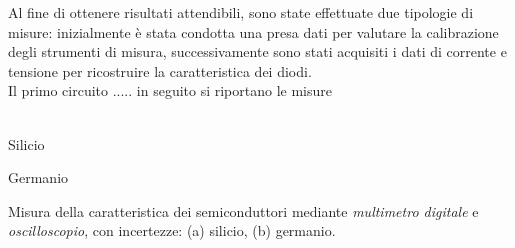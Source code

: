 \documentclass[@MAIN@]{subfiles}
\begin{document}
    Al fine di ottenere risultati attendibili, sono state effettuate due tipologie
    di misure: inizialmente è stata condotta una presa dati per valutare la
    calibrazione degli strumenti di misura, successivamente sono stati acquisiti
    i dati di corrente e tensione per ricostruire la caratteristica dei diodi. \\

    Il primo circuito .....
    in seguito si riportano le misure
    \\ \\
    \begin{center}
        
    \end{center}


    \begin{table}[ht]
        \centering
        \begin{subtable}[t]{.45\textwidth}
            \centering
            
            \captionsetup{justification=centering} %
            \caption{Silicio} %
            \label{tab:silicio}
        \end{subtable}
        \hfill
        \begin{subtable}[t]{.45\textwidth}
             \centering
             
             \captionsetup{justification=centering} %
             \caption{Germanio} %
             \label{tab:germanio}   
        \end{subtable}

        \vspace{0.5em} %

        \caption{Misura della caratteristica dei semiconduttori mediante \textit{multimetro digitale} e \textit{oscilloscopio}, con incertezze: (a) silicio, (b) germanio.}
        \label{tab:tabelle_semiconduttori}

    \end{table}
\end{document}
